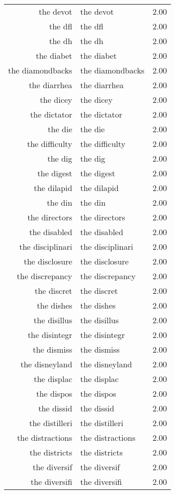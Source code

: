 \begin{table}[ht]
\begin{tabular}{rlr}
  the devot & the devot & 2.00 \\ 
  the dfl & the dfl & 2.00 \\ 
  the dh & the dh & 2.00 \\ 
  the diabet & the diabet & 2.00 \\ 
  the diamondbacks & the diamondbacks & 2.00 \\ 
  the diarrhea & the diarrhea & 2.00 \\ 
  the dicey & the dicey & 2.00 \\ 
  the dictator & the dictator & 2.00 \\ 
  the die & the die & 2.00 \\ 
  the difficulty & the difficulty & 2.00 \\ 
  the dig & the dig & 2.00 \\ 
  the digest & the digest & 2.00 \\ 
  the dilapid & the dilapid & 2.00 \\ 
  the din & the din & 2.00 \\ 
  the directors & the directors & 2.00 \\ 
  the disabled & the disabled & 2.00 \\ 
  the disciplinari & the disciplinari & 2.00 \\ 
  the disclosure & the disclosure & 2.00 \\ 
  the discrepancy & the discrepancy & 2.00 \\ 
  the discret & the discret & 2.00 \\ 
  the dishes & the dishes & 2.00 \\ 
  the disillus & the disillus & 2.00 \\ 
  the disintegr & the disintegr & 2.00 \\ 
  the dismiss & the dismiss & 2.00 \\ 
  the disneyland & the disneyland & 2.00 \\ 
  the displac & the displac & 2.00 \\ 
  the dispos & the dispos & 2.00 \\ 
  the dissid & the dissid & 2.00 \\ 
  the distilleri & the distilleri & 2.00 \\ 
  the distractions & the distractions & 2.00 \\ 
  the districts & the districts & 2.00 \\ 
  the diversif & the diversif & 2.00 \\ 
  the diversifi & the diversifi & 2.00 \\ 

\end{tabular}
\end{table}
